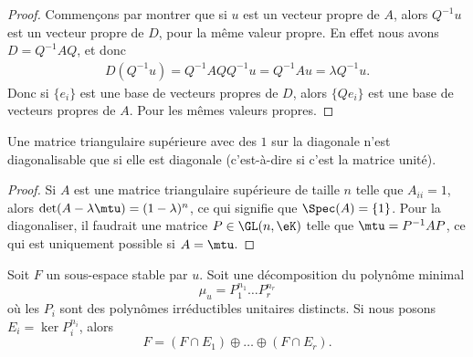 \begin{proof}
	Commençons par montrer que si \( u\) est un vecteur propre de \( A\), alors \( Q^{-1}u\) est un vecteur propre de \( D\), pour la même valeur propre. En effet nous avons \( D=Q^{-1}AQ\), et donc
	\begin{subequations}
		\begin{align}
			D(Q^{-1}u)=Q^{-1}AQQ^{-1}u=Q^{-1}Au=\lambda Q^{-1} u.
		\end{align}
	\end{subequations}
	Donc si \( \{ e_i \}\) est une base de vecteurs propres de \( D\), alors \( \{ Qe_i \}\) est une base de vecteurs propres de \( A\). Pour les mêmes valeurs propres.
\end{proof}

\begin{lemma}
	Une matrice triangulaire supérieure avec des \( 1\) sur la diagonale n'est diagonalisable que si elle est diagonale (c'est-à-dire si c'est la matrice unité).
\end{lemma}

\begin{proof}
	Si \( A\) est une matrice triangulaire supérieure de taille \( n\) telle que \( A_{ii}=1\), alors \( \det(A-\lambda\mtu)=(1-\lambda)^n\), ce qui signifie que \( \Spec(A)=\{ 1 \}\). Pour la diagonaliser, il faudrait une matrice \( P\in\GL(n,\eK)\) telle que \( \mtu=P^{-1}AP\), ce qui est uniquement possible si \( A=\mtu\).
\end{proof}

\begin{lemma}       \label{LemgnaEOk}
	Soit \( F\) un sous-espace stable par \( u\). Soit une décomposition du polynôme minimal
	\begin{equation}
		\mu_u=P_1^{n_1}\ldots P_r^{n_r}
	\end{equation}
	où les \( P_i\) sont des polynômes irréductibles unitaires distincts. Si nous posons \( E_i=\ker P_i^{n_i}\), alors
	\begin{equation}
		F=(F\cap E_1)\oplus\ldots \oplus(F\cap E_r).
	\end{equation}
\end{lemma}

